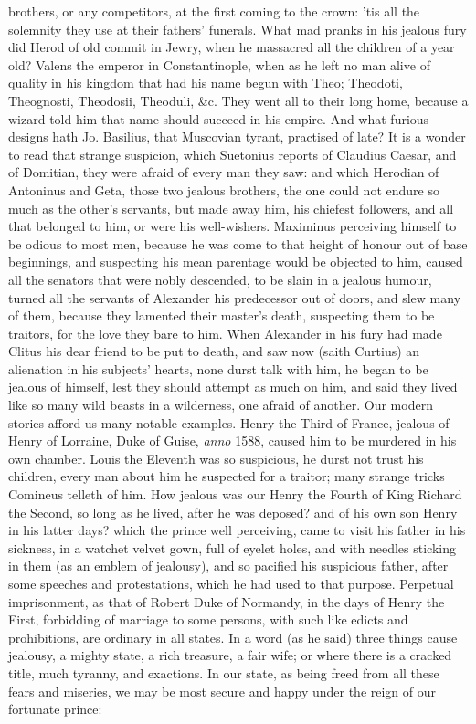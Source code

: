 {brothers, or any competitors, at the first coming to the crown: 'tis
all the solemnity they use at their fathers' funerals. What mad pranks
in his jealous fury did Herod of old commit in Jewry, when he massacred
all the children of a year old? Valens the emperor in
Constantinople, when as he left no man alive of quality in his kingdom
that had his name begun with Theo; Theodoti, Theognosti, Theodosii,
Theoduli, \&c. They went all to their long home, because a wizard told
him that name should succeed in his empire. And what furious designs
hath Jo. Basilius, that Muscovian tyrant, practised of late? It
is a wonder to read that strange suspicion, which Suetonius reports of
Claudius Caesar, and of Domitian, they were afraid of every man they
saw: and which Herodian of Antoninus and Geta, those two jealous
brothers, the one could not endure so much as the other's servants, but
made away him, his chiefest followers, and all that belonged to him, or
were his well-wishers. Maximinus perceiving himself to be odious
to most men, because he was come to that height of honour out of base
beginnings, and suspecting his mean parentage would be objected to him,
caused all the senators that were nobly descended, to be slain in a
jealous humour, turned all the servants of Alexander his predecessor
out of doors, and slew many of them, because they lamented their
master's death, suspecting them to be traitors, for the love they bare
to him. When Alexander in his fury had made Clitus his dear friend to
be put to death, and saw now (saith Curtius) an alienation in his
subjects' hearts, none durst talk with him, he began to be jealous of
himself, lest they should attempt as much on him, and said they lived
like so many wild beasts in a wilderness, one afraid of another. Our
modern stories afford us many notable examples. Henry the Third
of France, jealous of Henry of Lorraine, Duke of Guise, \emph{anno} 1588,
caused him to be murdered in his own chamber. Louis the Eleventh
was so suspicious, he durst not trust his children, every man about him
he suspected for a traitor; many strange tricks Comineus telleth of
him. How jealous was our Henry the Fourth of King Richard the
Second, so long as he lived, after he was deposed? and of his own son
Henry in his latter days? which the prince well perceiving, came to
visit his father in his sickness, in a watchet velvet gown, full of
eyelet holes, and with needles sticking in them (as an emblem of
jealousy), and so pacified his suspicious father, after some speeches
and protestations, which he had used to that purpose. Perpetual
imprisonment, as that of Robert Duke of Normandy, in the days of
Henry the First, forbidding of marriage to some persons, with such like
edicts and prohibitions, are ordinary in all states. In a word
(as he said) three things cause jealousy, a mighty state, a rich
treasure, a fair wife; or where there is a cracked title, much tyranny,
and exactions. In our state, as being freed from all these fears and
miseries, we may be most secure and happy under the reign of our
fortunate prince:

}
